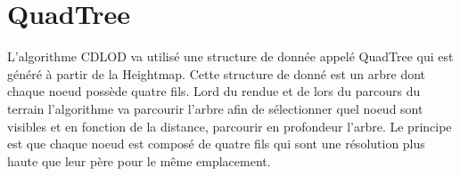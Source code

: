 \documentclass[12pt]{report}
\begin{document}
  
  \section{QuadTree}
  
  L'algorithme CDLOD va utilisé une structure de donnée appelé QuadTree qui est généré à partir de la Heightmap. Cette structure de donné est un arbre dont chaque noeud possède quatre fils. Lord du rendue et de lors du parcours du terrain l'algorithme va parcourir l'arbre afin de sélectionner quel noeud sont visibles et en fonction de la distance, parcourir en profondeur l'arbre. Le principe est que chaque noeud est composé de quatre fils qui sont une résolution plus haute que leur père pour le même emplacement.
  
  
  
  
  
  
  
  
  
  
\end{document}
